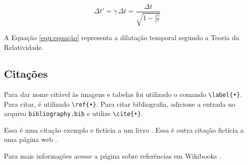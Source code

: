 \documentclass[11pt]{article}
\begin{document}
\begin{equation} \label{equ:equação}
\Delta t' = \gamma \, \Delta t = \frac{\Delta t}{\sqrt{1-\frac{v^2}{c^2}}}
\end{equation}

A Equação \ref{equ:equação} representa a dilatação temporal segundo a Teoria da Relatividade.

\subsection{Citações}

Para dar nome citável às imagens e tabelas foi utilizado o comando \verb!\label{•}!. Para citar, é utilizado \verb!\ref{•}!. Para citar bibliografia, adicione a entrada no arquivo \texttt{bibliography.bib} e utilize \verb!\cite{•}!.

Essa é uma citação exemplo e fictícia a um livro \cite{SIAM}. Essa é outra citação fictícia a uma página web \cite{wiki}.

Para mais informações acesse a página sobre referências em Wikibooks \cite{latex}.

\newpage


\end{document}
